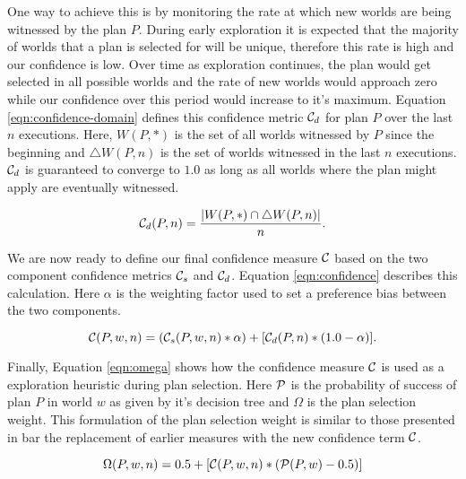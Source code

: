 One way to achieve this is by monitoring the rate at which new worlds are being witnessed by the plan $P$. During early exploration it is expected that the majority of worlds that a plan is selected for will be unique, therefore this rate is high and our confidence is low. Over time as exploration continues, the plan would get selected in all possible worlds and the rate of new worlds would approach zero while our confidence over this period would increase to it's maximum.  Equation \ref{eqn:confidence-domain} defines this confidence metric $\C_d$ for plan $P$ over the last $n$ executions. Here, $W(P,*)$ is the set of all worlds witnessed by $P$ since the beginning and $\triangle W(P,n)$ is the set of worlds witnessed in the last $n$ executions. $\C_d$ is guaranteed to converge to $1.0$ as long as all worlds where the plan might apply are eventually witnessed.

\begin{equation}
\C_d(P,n) = \frac{|W(P,*)\cap \triangle W(P,n) |}{n}.
\label{eqn:confidence-domain}
\end{equation}

We are now ready to define our final confidence measure $\C$ based on the two component confidence metrics $\C_s$ and $\C_d$. Equation \ref{eqn:confidence} describes this calculation. Here $\alpha$ is the weighting factor used to set a preference bias between the two components.

\begin{equation}
\C(P,w,n) = (\C_s(P,w,n)*\alpha) + [\C_d(P,n)*(1.0-\alpha)].
\label{eqn:confidence}
\end{equation}

Finally, Equation \ref{eqn:omega} shows how the confidence measure $\C$ is used as a exploration heuristic during plan selection. Here $\P$ is the probability of success of plan $P$ in world $w$ as given by it's decision tree and $\Omega$ is the plan selection weight. This formulation of the plan selection weight is similar to those presented in \cite{singh10:extending, singh10:learning} bar the replacement of earlier measures with the new confidence term $\C$.

\begin{equation}
\Omega(P,w,n) = 0.5 + \left[  \C(P,w,n) *  \left( \P(P,w) - 0.5 \right)  \right]
\label{eqn:omega}   
\end{equation}

